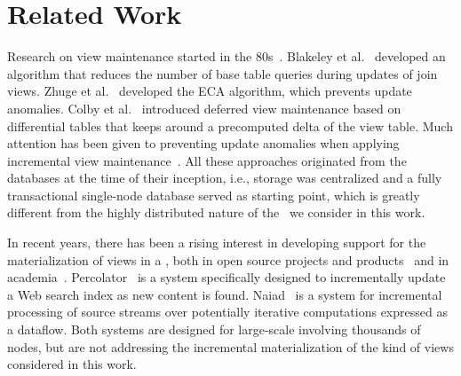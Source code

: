 \section{Related Work}
\label{sec:related_work}

%
%

Research on view maintenance started in the
80s~\cite{blakeley:efficiently,gupta:maintaining, zhuge:view,
  colby:algorithms, wang:efficient}. Blakeley et
al.~\cite{blakeley:efficiently} developed an algorithm that reduces
the number of base table queries during updates of join views. Zhuge
et al.~\cite{zhuge:view} developed the ECA algorithm, which prevents
update anomalies. Colby et al.~\cite{colby:algorithms} introduced
deferred view maintenance based on differential tables that keeps
around a precomputed delta of the view table.  Much attention has been
given to preventing update anomalies when applying incremental view
maintenance~\cite{gupta:maintaining, zhuge:view, salem:how}. All these
approaches originated from the databases at the time of their
inception, i.e., storage was centralized and a fully transactional
single-node database served as starting point, which is greatly
different from the highly distributed nature of the \KVS\ we consider
in this work. 


In recent years, there has been a rising interest in developing
support for the materialization of views in a \KVS, both in open
source projects and products~\cite{peng:percolator, murray:naiad,
  phoenix:apache, foundationdb} and in academia~\cite{jacobsen:viewmaintenance,
  agrawal:asynchronous, silberstein:feeding, jin:materialized,
  rabl:materialized, kate:easy, kejriwal:slik}. 
Percolator~\cite{peng:percolator} is a system specifically designed to
incrementally update a Web search index as new content is found.
Naiad~\cite{murray:naiad} is a system for incremental processing of
source streams over potentially iterative computations expressed as a
dataflow.  Both systems are designed for large-scale involving
thousands of nodes, but are not addressing the incremental
materialization of the kind of views considered in this work.


